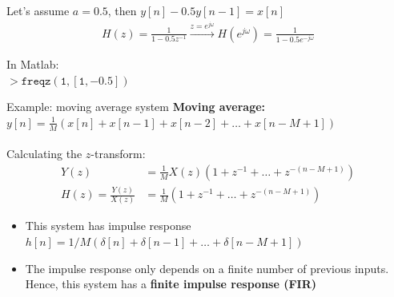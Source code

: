 \documentclass[10pt, handout]{beamer}
\begin{document}
\begin{frame}
\vspace{0.5cm}
Let's assume $a =0.5$, then $y[n] - 0.5y[n-1] = x[n]$
\begin{align*}
	H(z) = \frac{1}{1 - 0.5z^{-1}} \xrightarrow{z = e^{j\omega}} H(e^{j\omega}) = \frac{1}{1 - 0.5e^{-j\omega}} 
\end{align*}

In Matlab:\\
$> \mathtt{freqz(1, [1, -0.5])}$

\begin{center}
\end{center}

\end{frame}


\begin{frame}{Example: moving average system}
\textbf{Moving average:} $y[n] = \frac{1}{M}(x[n] + x[n-1] + x[n-2] + \ldots+ x[n-M+1])$
~\\
~\\

Calculating the $z$-transform:
\begin{align*}
Y(z) &= \frac{1}{M}X(z)(1 + z^{-1} + \ldots+ z^{-(n-M+1)}) \\
H(z) = \frac{Y(z)}{X(z)} &= \frac{1}{M}(1 + z^{-1} + \ldots+ z^{-(n-M+1)})
\end{align*}	

\begin{itemize}
	\pause\item This system has impulse response $h[n] = 1/M(\delta[n] + \delta[n-1] + \ldots + \delta[n-M+1])$
	\pause\item The impulse response only depends on a finite number of previous inputs. Hence, this system has a \textbf{finite impulse response (FIR)}
\end{itemize}	
\end{frame}
\end{document}
